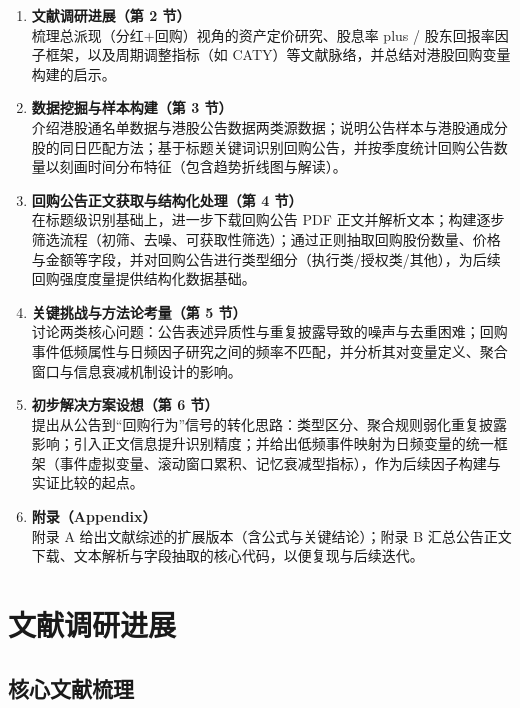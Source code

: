 \documentclass[a4paper,10pt]{article}
\begin{document}
\begin{enumerate}
    \item \textbf{文献调研进展（第 2 节）}\\
    梳理总派现（分红+回购）视角的资产定价研究、股息率 plus / 股东回报率因子框架，以及周期调整指标（如 CATY）等文献脉络，并总结对港股回购变量构建的启示。

    \item \textbf{数据挖掘与样本构建（第 3 节）}\\
    介绍港股通名单数据与港股公告数据两类源数据；说明公告样本与港股通成分股的同日匹配方法；基于标题关键词识别回购公告，并按季度统计回购公告数量以刻画时间分布特征（包含趋势折线图与解读）。

    \item \textbf{回购公告正文获取与结构化处理（第 4 节）}\\
    在标题级识别基础上，进一步下载回购公告 PDF 正文并解析文本；构建逐步筛选流程（初筛、去噪、可获取性筛选）；通过正则抽取回购股份数量、价格与金额等字段，并对回购公告进行类型细分（执行类/授权类/其他），为后续回购强度度量提供结构化数据基础。

    \item \textbf{关键挑战与方法论考量（第 5 节）}\\
    讨论两类核心问题：公告表述异质性与重复披露导致的噪声与去重困难；回购事件低频属性与日频因子研究之间的频率不匹配，并分析其对变量定义、聚合窗口与信息衰减机制设计的影响。

    \item \textbf{初步解决方案设想（第 6 节）}\\
    提出从公告到“回购行为”信号的转化思路：类型区分、聚合规则弱化重复披露影响；引入正文信息提升识别精度；并给出低频事件映射为日频变量的统一框架（事件虚拟变量、滚动窗口累积、记忆衰减型指标），作为后续因子构建与实证比较的起点。

    \item \textbf{附录（Appendix）}\\
    附录 A 给出文献综述的扩展版本（含公式与关键结论）；附录 B 汇总公告正文下载、文本解析与字段抽取的核心代码，以便复现与后续迭代。
\end{enumerate}


\section{文献调研进展}

\subsection{核心文献梳理}
\end{document}
